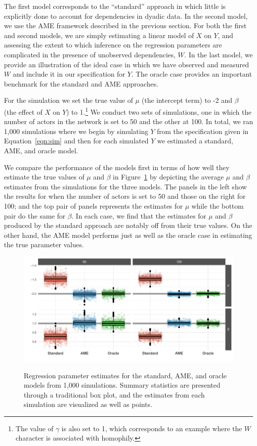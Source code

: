 The first model corresponds to the ``standard'' approach in which little is explicitly done to account for dependencies in dyadic data. In the second model, we use the AME framework described in the previous section. For both the first and second models, we are simply estimating a linear model of $X$ on $Y$, and assessing the extent to which inference on the regression parameters are complicated in the presence of unobserved dependencies, $W$. In the last model, we provide an illustration of the ideal case in which we have observed and measured $W$ and include it in our specification for $Y$. The oracle case provides an important benchmark for the standard and AME approaches.

For the simulation we set the true value of $\mu$ (the intercept term) to -2 and $\beta$ (the effect of $X$ on $Y$) to 1.\footnote{The value of $\gamma$ is also set to 1, which corresponds to an example where the $W$ character is associated with homophily.} We conduct two sets of simulations, one in which the number of actors in the network is set to 50 and the other at 100. In total, we ran 1,000 simulations where we begin by simulating $Y$ from the specification given in Equation~\ref{eqn:sim} and then for each simulated $Y$ we estimated a standard, AME, and oracle model. 

We compare the performance of the models first in terms of how well they estimate the true values of $\mu$ and $\beta$ in Figure~\ref{fig:ameBias} by depicting the average $\mu$ and $\beta$ estimates from the simulations for the three models. The panels in the left show the results for when the number of actors is set to 50 and those on the right for 100; and the top pair of panels represents the estimates for $\mu$ while the bottom pair do the same for $\beta$. In each case, we find that the estimates for $\mu$ and $\beta$ produced by the standard approach are notably off from their true values. On the other hand, the AME model performs just as well as the oracle case in estimating the true parameter values. 

\begin{figure}
	\centering
	\caption{Regression parameter estimates for the standard, AME, and oracle models from 1,000 simulations. Summary statistics are presented through a traditional box plot, and the estimates from each simulation are visualized as well as points.}
	\label{fig:ameBias}
	\includegraphics[width=1\textwidth]{ameSimBias_all.pdf} \\
\end{figure}

